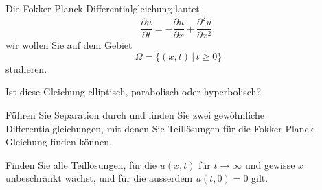 Die Fokker-Planck Differentialgleichung lautet
\[
\frac{\partial u}{\partial t}
=
-\frac{\partial u}{\partial x}+\frac{\partial^2u}{\partial x^2},
\]
wir wollen Sie auf dem Gebiet
\[
\Omega=\{(x,t)\,|\,  t \ge 0\}
\]
studieren.
\begin{teilaufgaben}
\item Ist diese Gleichung elliptisch, parabolisch oder hyperbolisch?
\item Führen Sie Separation durch und finden Sie zwei gewöhnliche
Differentialgleichungen, mit denen Sie Teillösungen für
die Fokker-Planck-Gleichung finden können.
\item Finden Sie alle Teillösungen, für die $u(x,t)$ für $t\to\infty$
und gewisse $x$ unbeschränkt wächst, und für die ausserdem $u(t,0)=0$ gilt.
\end{teilaufgaben}

